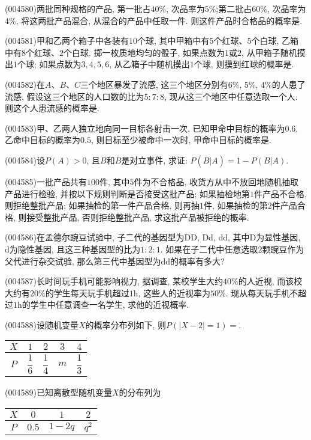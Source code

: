 \item (004580)两批同种规格的产品, 第一批占$40\%$, 次品率为$5\%$;第二批占$60\%$, 次品率为$4\%$, 将这两批产品混合, 从混合的产品中任取一件. 则这件产品时合格品的概率是.
\item (004581)甲和乙两个箱子中各装有$10$个球, 其中甲箱中有$5$个红球、$5$个白球, 乙箱中有$8$个红球、$2$个白球. 掷一枚质地均匀的骰子, 如果点数为$1$或$2$, 从甲箱子随机摸出$1$个球; 如果点数为$3, 4, 5, 6$, 从乙箱子中随机摸出$1$个球, 则摸到红球的概率是.
\item (004582)在$A$、$B$、$C$三个地区暴发了流感, 这三个地区分别有$6\%$, $5\%$, $4\%$的人患了流感, 假设这三个地区的人口数的比为$5: 7: 8$, 现从这三个地区中任意选取一个人. 则这个人患流感的概率是.
\item (004583)甲、乙两人独立地向同一目标各射击一次, 已知甲命中目标的概率为$0.6$, 乙命中目标的概率为$0.5$, 则目标至少被命中一次时, 甲命中目标的概率是.
\item (004584)设$P(A)>0$, 且$B$和$\overline B$是对立事件, 求证: $P(\overline B|A)=1-P(B|A)$.
\item (004585)一批产品共有$100$件, 其中$5$件为不合格品, 收货方从中不放回地随机抽取产品进行检验, 并按以下规则判断是否接受这批产品; 如果抽检地第$1$件产品不合格, 则拒绝整批产品; 如果抽检的第一件产品合格, 则再抽$1$件, 如果抽检的第$2$件产品合格, 则接受整批产品, 否则拒绝整批产品, 求这批产品被拒绝的概率.
\item (004586)在孟德尔豌豆试验中, 子二代的基因型为DD, Dd, dd, 其中D为显性基因, d为隐性基因, 且这三种基因型的比为$1: 2: 1$. 如果在子二代中任意选取$2$颗豌豆作为父代进行杂交试验, 那么第三代中基因型为dd的概率有多大?
\item (004587)长时间玩手机可能影响视力, 据调查, 某校学生大约$40\%$的人近视, 而该校大约有$20\%$的学生每天玩手机超过$1\text{h}$, 这些人的近视率为$50\%$. 现从每天玩手机不超过$1\text{h}$的学生中任意调查一名学生, 求他的近视概率.
\item (004588)设随机变量$X$的概率分布列如下, 则$P(|X-2|=1)=$.
\begin{center}
    \begin{tabular}{|c|c|c|c|c|}
        \hline
        $X$ & $1$ & $2$ & $3$ & $4$\\ \hline
        $P$ & $\dfrac 16$ & $\dfrac 14$ & $m$ & $\dfrac 13$\\ \hline       
    \end{tabular}
\end{center}
\item (004589)已知离散型随机变量$X$的分布列为
\begin{center}
    \begin{tabular}{|c|c|c|c|}
        \hline
        $X$ & $0$ & $1$ & $2$ \\ \hline
        $P$ & $0.5$ & $1-2q$ & $q^2$ \\ \hline
    \end{tabular}
\end{center}
